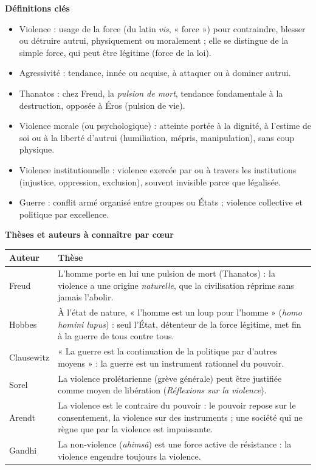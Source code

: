 \documentclass[11pt]{article}
\newcommand{\cle}[1]{{\popxbold\color{popdark}#1}}
\begin{document}
\begin{bilan}
\textbf{Définitions clés}
\begin{itemize}
  \item \cle{Violence} : usage de la force (du latin \emph{vis}, « force ») pour contraindre, blesser ou détruire autrui, physiquement ou moralement ; elle se distingue de la simple \cle{force}, qui peut être légitime (force de la loi).
  \item \cle{Agressivité} : tendance, innée ou acquise, à attaquer ou à dominer autrui.
  \item \cle{Thanatos} : chez Freud, la \emph{pulsion de mort}, tendance fondamentale à la destruction, opposée à Éros (pulsion de vie).
  \item \cle{Violence morale (ou psychologique)} : atteinte portée à la dignité, à l'estime de soi ou à la liberté d'autrui (humiliation, mépris, manipulation), sans coup physique.
  \item \cle{Violence institutionnelle} : violence exercée par ou à travers les institutions (injustice, oppression, exclusion), souvent invisible parce que légalisée.
  \item \cle{Guerre} : conflit armé organisé entre groupes ou États ; violence collective et politique par excellence.
\end{itemize}

\textbf{Thèses et auteurs à connaître par cœur}

\begin{center}
\begin{tabularx}{\linewidth}{|l|X|}
\hline
\rowcolor{popblueL} \textbf{Auteur} & \textbf{Thèse} \\
\hline
Freud & L'homme porte en lui une pulsion de mort (Thanatos) : la violence a une origine \emph{naturelle}, que la civilisation réprime sans jamais l'abolir. \\
\hline
Hobbes & À l'état de nature, « l'homme est un loup pour l'homme » (\emph{homo homini lupus}) : seul l'État, détenteur de la force légitime, met fin à la guerre de tous contre tous. \\
\hline
Clausewitz & « La guerre est la continuation de la politique par d'autres moyens » : la guerre est un instrument rationnel du pouvoir. \\
\hline
Sorel & La violence prolétarienne (grève générale) peut être justifiée comme moyen de libération (\emph{Réflexions sur la violence}). \\
\hline
Arendt & La violence est le contraire du pouvoir : le pouvoir repose sur le consentement, la violence sur des instruments ; une société qui ne règne que par la violence est impuissante. \\
\hline
Gandhi & La non-violence (\emph{ahimsâ}) est une force active de résistance : la violence engendre toujours la violence. \\
\hline
\end{tabularx}
\end{center}


\end{bilan}
\end{document}
